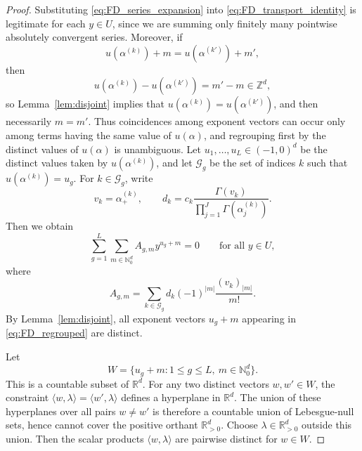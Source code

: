 \documentclass[10pt,a4paper]{amsart}
\begin{document}
\begin{proof}
Substituting \eqref{eq:FD_series_expansion} into \eqref{eq:FD_transport_identity}
is legitimate for each $y\in U$, since we are summing only finitely
many pointwise absolutely convergent series. Moreover, if
\[
u(\alpha^{(k)})+m=u(\alpha^{(k')})+m',
\]
then
\[
u(\alpha^{(k)})-u(\alpha^{(k')})=m'-m\in\mathbb{Z}^{d},
\]
so Lemma~\ref{lem:disjoint} implies that $u(\alpha^{(k)})=u(\alpha^{(k')})$,
and then necessarily $m=m'$. Thus coincidences among exponent vectors
can occur only among terms having the same value of $u(\alpha)$, and
regrouping first by the distinct values of $u(\alpha)$ is unambiguous.
Let $u_{1},\dots,u_{L}\in(-1,0)^{d}$ be the distinct values taken
by $u(\alpha^{(k)})$, and let $\mathcal{G}_{g}$ be the set of indices
$k$ such that $u(\alpha^{(k)})=u_{g}$. For $k\in\mathcal{G}_{g}$,
write 
\[
v_{k}=\alpha_{+}^{(k)},\qquad d_{k}=c_{k}\frac{\Gamma(v_{k})}{\prod_{j=1}^{J}\Gamma(\alpha_{j}^{(k)})}.
\]
Then we obtain 
\begin{equation}
\sum_{g=1}^{L}\sum_{m\in\mathbb{N}_{0}^{d}}A_{g,m}y^{u_{g}+m}=0\qquad\text{for all }y\in U,\label{eq:FD_regrouped}
\end{equation}
where 
\begin{equation}
A_{g,m}=\sum_{k\in\mathcal{G}_{g}}d_{k}(-1)^{|m|}\frac{(v_{k})_{|m|}}{m!}.\label{eq:FD_Agm}
\end{equation}
By Lemma~\ref{lem:disjoint}, all exponent vectors $u_{g}+m$ appearing
in \eqref{eq:FD_regrouped} are distinct.

Let 
\[
W=\{u_{g}+m:1\le g\le L,\ m\in\mathbb{N}_{0}^{d}\}.
\]
This is a countable subset of $\mathbb{R}^{d}$. For any two distinct
vectors $w,w'\in W$, the constraint $\langle w,\lambda\rangle=\langle w',\lambda\rangle$
defines a hyperplane in $\mathbb{R}^{d}$. The union of these hyperplanes
over all pairs $w\neq w'$ is therefore a countable union of Lebesgue-null
sets, hence cannot cover the positive orthant $\mathbb{R}_{>0}^{d}$.
Choose $\lambda\in\mathbb{R}_{>0}^{d}$ outside this union. Then the
scalar products $\langle w,\lambda\rangle$ are pairwise distinct
for $w\in W$.


\end{proof}
\end{document}
